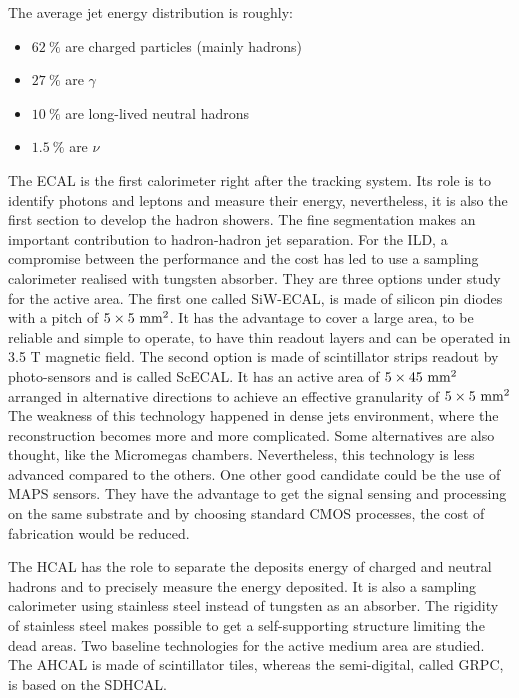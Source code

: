       The average jet energy distribution is roughly: 
      \begin{itemize}
        \item $62~\%$ are charged particles (mainly hadrons)
        \item $27~\%$ are $\gamma$
        \item $10~\%$ are long-lived neutral hadrons
        \item $1.5~\%$ are $\nu$
      \end{itemize}

      The \gls{ECAL} is the first calorimeter right after the tracking system.
      Its role is to identify photons and leptons and measure their energy, nevertheless, it is also the first section to develop the hadron showers.
      The fine segmentation makes an important contribution to hadron-hadron jet separation.
      For the \gls{ILD}, a compromise between the performance and the cost has led to use a sampling calorimeter realised with tungsten absorber.
      They are three options under study for the active area.
      The first one called SiW-ECAL, is made of silicon pin diodes with a pitch of $5 \times 5~\rm{mm}^2$. 
      It has the advantage to cover a large area, to be reliable and simple to operate, to have thin readout layers and can be operated in 3.5 T magnetic field.
      The second option is made of scintillator strips readout by photo-sensors and is called ScECAL.
      It has an active area of $5 \times 45~\rm{mm}^2$ arranged in alternative directions to achieve an effective granularity of $5 \times 5~\rm{mm}^2$ 
      The weakness of this technology happened in dense jets environment, where the reconstruction becomes more and more complicated.
      Some alternatives are also thought, like the Micromegas chambers. Nevertheless, this technology is less advanced compared to the others.
      One other good candidate could be the use of \gls{MAPS} sensors.
      They have the advantage to get the signal sensing and processing on the same  substrate and by choosing standard CMOS processes, the cost of fabrication would be reduced.

      The \gls{HCAL} has the role to separate the deposits energy of charged and neutral hadrons and to precisely measure the energy deposited.
      It is also a sampling calorimeter using stainless steel instead of tungsten as an absorber. 
      The rigidity of stainless steel makes possible to get a self-supporting structure limiting the dead areas.
      Two baseline technologies for the active medium area are studied.
      The  \gls{AHCAL} is made of scintillator tiles, whereas the semi-digital, called \gls{GRPC}, is based on the \gls{SDHCAL}.

